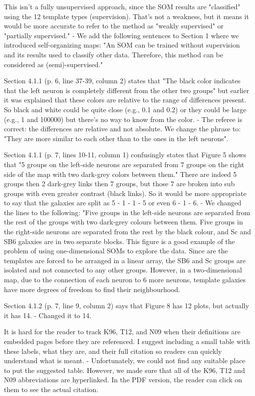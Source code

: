 This isn't a fully unsupervised approach, since the SOM results are "classified" using the 12 template types (supervision).  That's not a weakness, but it means it would be more accurate to refer to the  method as "weakly supervised" or "partially supervised."
    - We add the following sentences to Section 1 where we introduced self-organizing maps: "An SOM can be trained without supervision and its results used to classify other data. Therefore, this method can be considered as (semi)-supervised." 

Section 4.1.1 (p. 6, line 37-39, column 2) states that "The black color indicates that the left neuron is completely different from the other two groups" but earlier it was explained that these colors are relative to the range of differences present.  So black and white could be quite close (e.g., 0.1 and 0.2) or they could be large (e.g., 1 and 100000) but there's no way to know from the color.
    - The referee is correct: the differences are relative and not absolute. We change the phrase to:
        "They are more similar to each other than to the ones in the left neurons". 
        
        
Section 4.1.1 (p. 7, lines 10-11, column 1) confusingly states that Figure 5 shows that "5 groups on the left-side neurons are separated from 7 groups on the right side of the map with two dark-grey colors between them."  There are indeed 5 groups then 2 dark-grey links then 7 groups, but those 7 are broken into sub groups with even greater contrast (black links).  So it would be more appropriate to say that the galaxies are split as 5 - 1 - 1 - 5 or even 6 - 1 - 6.
    - We changed the lines to the following:
        "Five groups in the left-side neurons are separated from the rest of the groups with two dark-grey colours between them. Five groups in the right-side neurons are separated from the rest by the black colour, and Sc and SB6 galaxies are in two separate blocks. This figure is a good example of the problem of using one-dimensional SOMs to explore the data. Since are the templates are forced to be arranged in a linear array, the SB6 and Sc groups are isolated and not connected to any other groups. However, in a two-dimensional map, due to the connection of each neuron to 6 more neurons, template galaxies have more degrees of freedom to find their neighbourhood.

Section 4.1.2 (p. 7, line 9, column 2) says that Figure 8 has 12 plots, but actually it has 14.
    - Changed it to 14.

It is hard for the reader to track K96, T12, and N09 when their definitions are embedded pages before they are referenced.  I suggest including a small table with these labels, what they are, and their full citation so readers can quickly understand what is meant.
    - Unfortunately, we could not find any suitable place to put the suggested table. However, we made sure that all of the K96, T12 and N09 abbreviations are hyperlinked. In the PDF version, the reader can click on them to see the actual citation.

